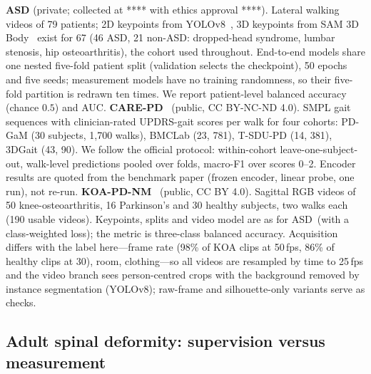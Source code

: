 \documentclass[runningheads]{llncs}
\newcommand{\asd}{ASD}
\begin{document}
\textbf{\asd} (private; collected at **** with ethics approval ****). Lateral walking videos
of 79 patients; 2D keypoints from YOLOv8~\cite{ultralytics2023yolov8}, 3D keypoints from
SAM 3D Body~\cite{sam3dbody2025} exist for 67 (46 \asd, 21 non-\asd: dropped-head syndrome,
lumbar stenosis, hip osteoarthritis), the cohort used throughout. End-to-end models share
one nested five-fold patient split (validation selects the checkpoint), 50 epochs and five
seeds; measurement models have no training randomness, so their five-fold partition is
redrawn ten times. We report patient-level balanced accuracy (chance $0.5$) and AUC.
\textbf{CARE-PD}~\cite{carepd2025} (public, CC BY-NC-ND 4.0). SMPL gait sequences with clinician-rated
UPDRS-gait scores per walk for four cohorts: PD-GaM (30 subjects, 1,700 walks), BMCLab (23,
781), T-SDU-PD (14, 381), 3DGait (43, 90). We follow the official protocol: within-cohort
leave-one-subject-out, walk-level predictions pooled over folds, macro-F1 over scores 0--2.
Encoder results are quoted from the benchmark paper (frozen encoder, linear probe, one run),
not re-run. \textbf{KOA-PD-NM}~\cite{kour2022koapdnm_icicc,kour2020koapdnm} (public, CC BY 4.0). Sagittal RGB videos of 50
knee-osteoarthritis, 16 Parkinson's and 30 healthy subjects, two walks each (190 usable
videos). Keypoints, splits and video model are as for \asd\ (with a class-weighted loss); the
metric is three-class balanced accuracy. Acquisition differs with the label here---frame rate (98\% of KOA clips
at 50\,fps, 86\% of healthy clips at 30), room, clothing---so all videos are resampled by
time to 25\,fps and the video branch sees person-centred crops with the background removed
by instance segmentation (YOLOv8); raw-frame and silhouette-only variants serve as checks.

\subsection{Adult spinal deformity: supervision versus measurement}

\begin{table}[t]
\centering
\caption{\asd, 67 patients, patient-level. End-to-end rows: fixed split, 50 epochs, mean
$\pm$ s.d.\ over five seeds. Measurement rows: ten random five-fold partitions.}
\label{tab:asd}
\resizebox{\linewidth}{!}{}
\end{table}
\end{document}
